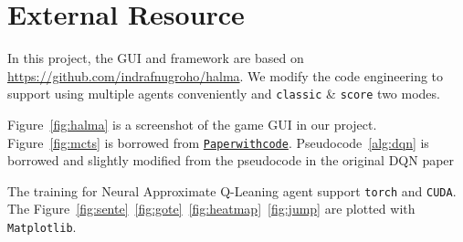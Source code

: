 \section{External Resource}
In this project, the GUI and framework are based on \url{https://github.com/indrafnugroho/halma}. We modify the code engineering to support using multiple agents conveniently and \texttt{classic} \& \texttt{score} two modes. 

Figure~\ref{fig:halma} is a screenshot of the game GUI in our project. Figure~\ref{fig:mcts} is borrowed from \href{https://paperswithcode.com/method/monte-carlo-tree-search} {\texttt{Paperwithcode}}. Pseudocode~\ref{alg:dqn} is borrowed and slightly modified from the pseudocode in the original DQN paper\cite{DBLP:journals/corr/MnihKSGAWR13}

The training for Neural Approximate Q-Leaning agent support \texttt{torch} and \texttt{CUDA}. The Figure~\ref{fig:sente}~\ref{fig:gote}~\ref{fig:heatmap}~\ref{fig:jump} are plotted with \texttt{Matplotlib}.